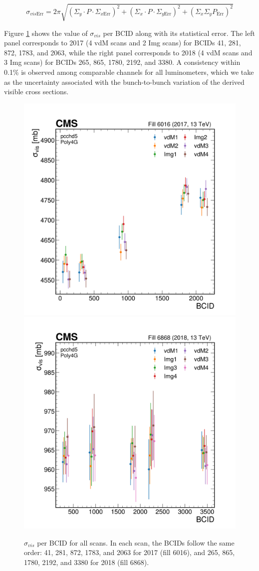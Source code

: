\begin{equation}
\sigma_{vis\text{Err}}= 2 \pi \sqrt{ (\Sigma_{y} \cdot P \cdot \Sigma_{x\text{Err}})^{2} + (\Sigma_{x} \cdot P \cdot \Sigma_{y \text{Err}})^{2} + (\Sigma_{x} \Sigma_{y} P_{\text{Err}})^{2} }
\label{sigma_err}
\end{equation}

Figure \ref{sigmavis_perbcid} shows the value of $\sigma_{vis}$ per BCID along with its statistical error. The left panel corresponds to 2017 (4 vdM scans and 2 Img scans) for BCIDs 41, 281, 872, 1783, and 2063, while the right panel corresponds to 2018 (4 vdM scans and 3 Img scans) for BCIDs 265, 865, 1780, 2192, and 3380. A consistency within 0.1\% is observed among comparable channels for all luminometers, which we take as the uncertainty associated with the bunch-to-bunch variation of the derived visible cross sections.


\begin{center}
  \begin{figure}[h!]
    \centering
   \includegraphics[width=.49\textwidth]{figures/vdMfitting/sigVis/Sigma_vis_6016_new_Per_BCID.png}
   \includegraphics[width=.49\textwidth]{figures/vdMfitting/sigVis/Sigma_vis_6868_new_Per_BCID.png}
    \caption[$\sigma_{vis}$ per BCID for all scans]{ $\sigma_{vis}$ per BCID for all scans. In each scan, the BCIDs follow the same order: 41, 281, 872, 1783, and 2063 for 2017 (fill 6016), and 265, 865, 1780, 2192, and 3380 for 2018 (fill 6868).}
    \label{sigmavis_perbcid}
  \end{figure}
\end{center}

